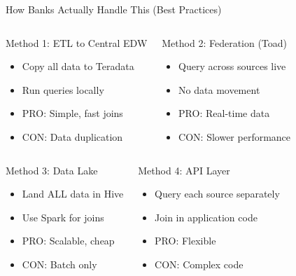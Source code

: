 \documentclass{beamer}
\begin{document}
	
	\begin{frame}{How Banks Actually Handle This (Best Practices)}
		\begin{columns}[T]
			\begin{block}{Method 1: ETL to Central EDW}
				\begin{itemize}
					\small
					\item Copy all data to Teradata
					\item Run queries locally
					\item PRO: Simple, fast joins
					\item CON: Data duplication
				\end{itemize}
			\end{block}
			
			\begin{block}{Method 2: Federation (Toad)}
				\begin{itemize}
					\small
					\item Query across sources live
					\item No data movement
					\item PRO: Real-time data
					\item CON: Slower performance
				\end{itemize}
			\end{block}
		\end{columns}
		
		\vspace{0.3cm}
		\begin{columns}[T]
			\begin{block}{Method 3: Data Lake}
				\begin{itemize}
					\small
					\item Land ALL data in Hive
					\item Use Spark for joins
					\item PRO: Scalable, cheap
					\item CON: Batch only
				\end{itemize}
			\end{block}
			
			\begin{block}{Method 4: API Layer}
				\begin{itemize}
					\small
					\item Query each source separately
					\item Join in application code
					\item PRO: Flexible
					\item CON: Complex code
				\end{itemize}
			\end{block}
		\end{columns}
	\end{frame}
	
\end{document}
